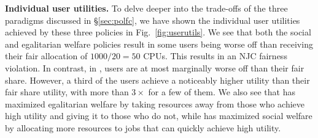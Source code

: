 \insertTableMetrics

\insertFigSP
\insertFigMSResults

\textbf{Individual user utilities.}
To delve deeper into the trade-offs of the three paradigms discussed in
\S\ref{sec:polfc}, we have shown the individual  user utilities achieved by these three policies
in Fig.~\ref{fig:userutils}.
We see that both the social and egalitarian welfare policies result in some users being worse off
than receiving their fair allocation of $1000/20=50$ CPUs.
This results in an NJC fairness violation.
In contrast, in \cilantronjc, users are at most marginally worse off than their fair share.
However, a third of the users achieve a noticeably higher utility than their fair share utility,
with more than $3\times$ for a few of them.
We also see that \cilantroews has  maximized egalitarian welfare by taking
resources away from those who achieve high utility and giving it to those who do not, while
\cilantrosws has maximized  social welfare by allocating more resources to jobs that
can quickly achieve high utility.




